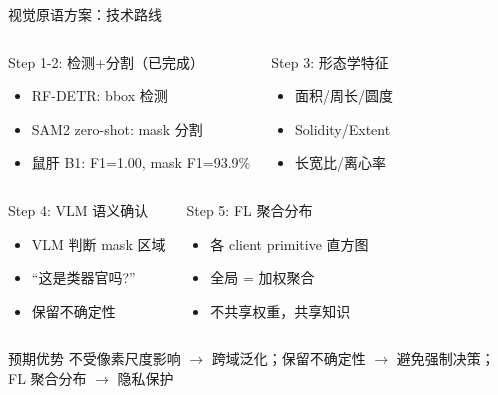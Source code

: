 \documentclass[aspectratio=169, 10pt]{beamer}
\begin{document}
\begin{frame}{视觉原语方案：技术路线}
  \begin{columns}[T]
    \begin{block}{Step 1-2: 检测+分割（已完成）}
      \begin{itemize}
        \item RF-DETR: bbox 检测
        \item SAM2 zero-shot: mask 分割
        \item 鼠肝 B1: F1=1.00, mask F1=93.9\%
      \end{itemize}
    \end{block}
    \begin{block}{Step 3: 形态学特征}
      \begin{itemize}
        \item 面积/周长/圆度
        \item Solidity/Extent
        \item 长宽比/离心率
      \end{itemize}
    \end{block}
  \end{columns}
  \vspace{0em}
  \begin{columns}[T]
    \begin{block}{Step 4: VLM 语义确认}
      \begin{itemize}
        \item VLM 判断 mask 区域
        \item ``这是类器官吗?''
        \item 保留不确定性
      \end{itemize}
    \end{block}
    \begin{block}{Step 5: FL 聚合分布}
      \begin{itemize}
        \item 各 client primitive 直方图
        \item 全局 = 加权聚合
        \item 不共享权重，共享知识
      \end{itemize}
    \end{block}
  \end{columns}
  \vspace{0em}
  \begin{alertblock}{预期优势}
    不受像素尺度影响 $\to$ 跨域泛化；保留不确定性 $\to$ 避免强制决策；FL 聚合分布 $\to$ 隐私保护
  \end{alertblock}
\end{frame}
\end{document}
